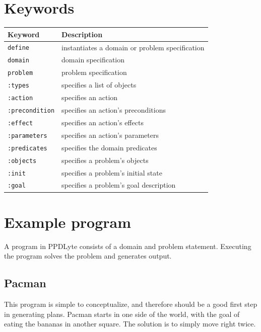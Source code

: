 \documentclass[
a4paper, %
11pt, %
onecolumn, %
openany, %
]{memoir}
\begin{document}
\section{Keywords}
\begin{center}
\begin{tabular}{ l  l }
Keyword    & Description\\
\hline
\hline
\texttt{define}  & instantiates a domain or problem specification\\
\hline
\texttt{domain}  & domain specification \\
\hline
\texttt{problem} & problem specification \\
\hline
\texttt{:types}  & specifies a list of objects \\
\hline
\texttt{:action} & specifies an action \\
\hline
\texttt{:precondition} & specifies an action's preconditions \\
\hline
\texttt{:effect} & specifies an action's effects\\
\hline
\texttt{:parameters} & specifies an action's parameters\\
\hline
\texttt{:predicates} & specifies the domain predicates \\
\hline
\texttt{:objects} & specifies a problem's objects\\
\hline
\texttt{:init} & specifies a problem's initial state\\
\hline
\texttt{:goal} & specifies a problem's goal description\\
\hline
\end{tabular}
\end{center}

\section{Example program}
A program in PPDLyte consists of a domain and problem statement. Executing the program solves the problem and generates output.

\subsection{Pacman}
This program is simple to conceptualize, and therefore should be a good first step in generating plans. Pacman starts in one side of the world, with the goal of eating the bananas in another square. The solution is to simply move right twice.\\
\end{document}
